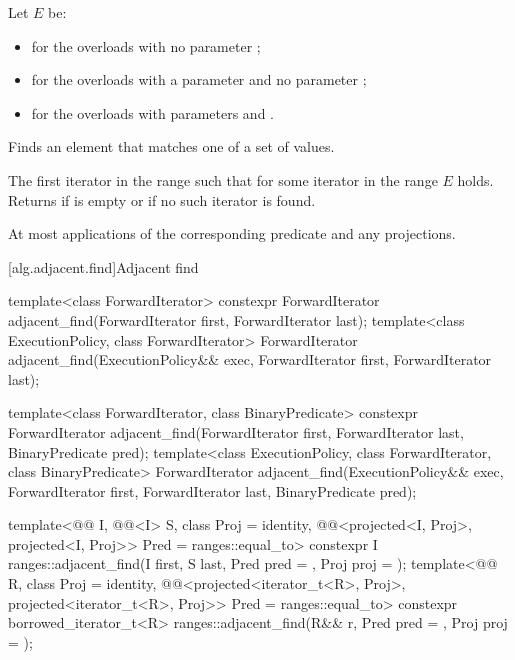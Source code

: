 \begin{itemdescr}
\pnum
Let $E$ be:
\begin{itemize}
\item {} for the overloads with no parameter ;
\item {} for the overloads with a parameter  and no parameter ;
\item {} for the overloads with parameters  and .
\end{itemize}

\pnum
\effects
Finds an element that matches one of a set of values.

\pnum
\returns
The first iterator  in the range 
such that for some iterator  in the range 
$E$ holds.
Returns 
if  is empty or
if no such iterator is found.

\pnum
\complexity
At most  applications
of the corresponding predicate and any projections.
\end{itemdescr}

[alg.adjacent.find]{Adjacent find}

%
\begin{itemdecl}
template<class ForwardIterator>
  constexpr ForwardIterator
    adjacent_find(ForwardIterator first, ForwardIterator last);
template<class ExecutionPolicy, class ForwardIterator>
  ForwardIterator
    adjacent_find(ExecutionPolicy&& exec,
                  ForwardIterator first, ForwardIterator last);

template<class ForwardIterator, class BinaryPredicate>
  constexpr ForwardIterator
    adjacent_find(ForwardIterator first, ForwardIterator last,
                  BinaryPredicate pred);
template<class ExecutionPolicy, class ForwardIterator, class BinaryPredicate>
  ForwardIterator
    adjacent_find(ExecutionPolicy&& exec,
                  ForwardIterator first, ForwardIterator last,
                  BinaryPredicate pred);

template<@@ I, @@<I> S, class Proj = identity,
         @@<projected<I, Proj>,
                                   projected<I, Proj>> Pred = ranges::equal_to>
  constexpr I ranges::adjacent_find(I first, S last, Pred pred = {}, Proj proj = {});
template<@@ R, class Proj = identity,
         @@<projected<iterator_t<R>, Proj>,
                                   projected<iterator_t<R>, Proj>> Pred = ranges::equal_to>
  constexpr borrowed_iterator_t<R> ranges::adjacent_find(R&& r, Pred pred = {}, Proj proj = {});
\end{itemdecl}

